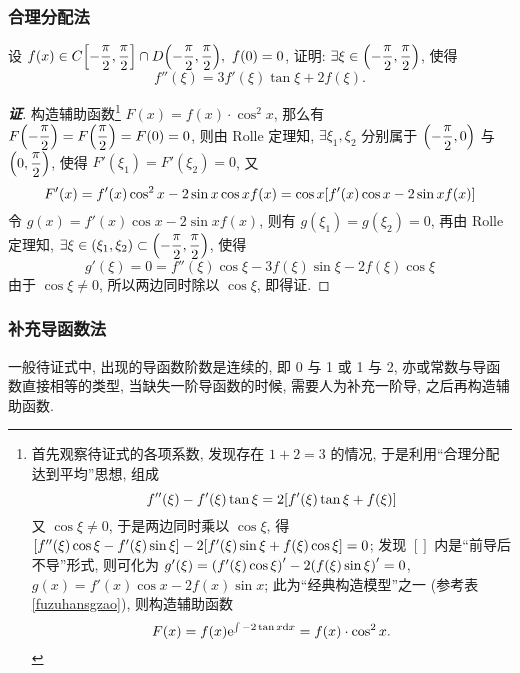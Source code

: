 \subsubsection{合理分配法}

\begin{example}
    设 $f(x)\in C\qty[-\dfrac{\pi}{2},\dfrac{\pi}{2}]\cap D\qty(-\dfrac{\pi}{2},\dfrac{\pi}{2}),~f(0)=0$, 
    证明: $\exists\xi\in\qty(-\dfrac{\pi}{2},\dfrac{\pi}{2})$, 使得 $$f''(\xi)=3f'(\xi)\tan\xi+2f(\xi).$$
\end{example}
\begin{proof}[{\songti \textbf{证}}]
    构造辅助函数\footnote{
        首先观察待证式的各项系数, 发现存在 $1+2=3$ 的情况, 于是利用“合理分配达到平均”思想, 组成 $$f''(\xi)-f'(\xi)\tan\xi=2\qty[f'(\xi)\tan\xi+f(\xi)]$$
        又 $\cos\xi\neq0$, 于是两边同时乘以 $\cos\xi$, 得 $\qty[f''(\xi)\cos\xi-f'(\xi)\sin\xi]-2\qty[f'(\xi)\sin\xi+f(\xi)\cos\xi]=0$;
        发现 $[]$ 内是“前导后不导”形式, 则可化为 $g'(\xi)=\qty(f'(\xi)\cos\xi)'-2\qty(f(\xi)\sin\xi)'=0$, $g(x)=f'(x)\cos x-2f(x)\sin x$;
        此为“经典构造模型”之一 (参考表 \ref{fuzuhansgzao}), 则构造辅助函数 $$F(x)=f(x)\mathrm{e}^{\int-2\tan x\dd x}=f(x)\cdot\cos^2x.$$
    } $F(x)=f(x)\cdot\cos^2x$, 那么有 $F\qty(-\dfrac{\pi}{2})=F\qty(\dfrac{\pi}{2})=F(0)=0$, 则由 Rolle 定理知, 
    $\exists\xi_1,\xi_2$ 分别属于 $\qty(-\dfrac{\pi}{2},0)$ 与 $\qty(0,\dfrac{\pi}{2})$, 使得 $F'(\xi_1)=F'(\xi_2)=0$, 又
    $$F'(x)=f'(x)\cos^2x-2\sin x\cos xf(x)=\cos x\qty[f'(x)\cos x-2\sin xf(x)]$$
    令 $g(x)=f'(x)\cos x-2\sin xf(x)$, 则有 $g(\xi_1)=g(\xi_2)=0$, 再由 Rolle 定理知, 
    $\exists\xi\in(\xi_1,\xi_2)\subset\qty(-\dfrac{\pi}{2},\dfrac{\pi}{2})$, 使得
    $$g'(\xi)=0=f''(\xi)\cos \xi-3f(\xi)\sin\xi-2f(\xi)\cos\xi$$
    由于 $\cos\xi\neq0$, 所以两边同时除以 $\cos\xi$, 即得证.
\end{proof}

\subsubsection{补充导函数法}

一般待证式中, 出现的导函数阶数是连续的, 即 0 与 1 或 1 与 2, 亦或常数与导函数直接相等的类型, 当缺失一阶导函数的时候, 需要人为补充一阶导, 之后再构造辅助函数.

